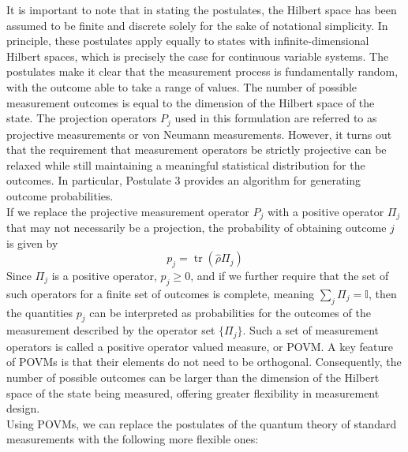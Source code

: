 It is important to note that in stating the postulates, the Hilbert space has been assumed to be finite and discrete solely for the sake of notational simplicity. In principle, these postulates apply equally to states with infinite-dimensional Hilbert spaces, which is precisely the case for continuous variable systems. The postulates make it clear that the measurement process is fundamentally random, with the outcome able to take a range of values. The number of possible measurement outcomes is equal to the dimension of the Hilbert space of the state. The projection operators $P_j$ used in this formulation are referred to as projective measurements or von Neumann measurements. However, it turns out that the requirement that measurement operators be strictly projective can be relaxed while still maintaining a meaningful statistical distribution for the outcomes. In particular, Postulate 3 provides an algorithm for generating outcome probabilities. \\

If we replace the projective measurement operator $P_j$ with a positive operator $\Pi_j$ that may not necessarily be a projection, the probability of obtaining outcome $j$ is given by 
\begin{equation}
    p_j = \operatorname{tr}(\hat{\rho} \Pi_j)
\end{equation}
 Since $\Pi_j$ is a positive operator, $p_j \geq 0$, and if we further require that the set of such operators for a finite set of outcomes is complete, meaning $\sum_j \Pi_j = \mathbb{I}$, then the quantities $p_j$ can be interpreted as probabilities for the outcomes of the measurement described by the operator set $\{\Pi_j\}$. Such a set of measurement operators is called a positive operator valued measure, or POVM. A key feature of POVMs is that their elements do not need to be orthogonal. Consequently, the number of possible outcomes can be larger than the dimension of the Hilbert space of the state being measured, offering greater flexibility in measurement design.\\

 Using POVMs, we can replace the postulates of the quantum theory of standard measurements with the following more flexible ones:

